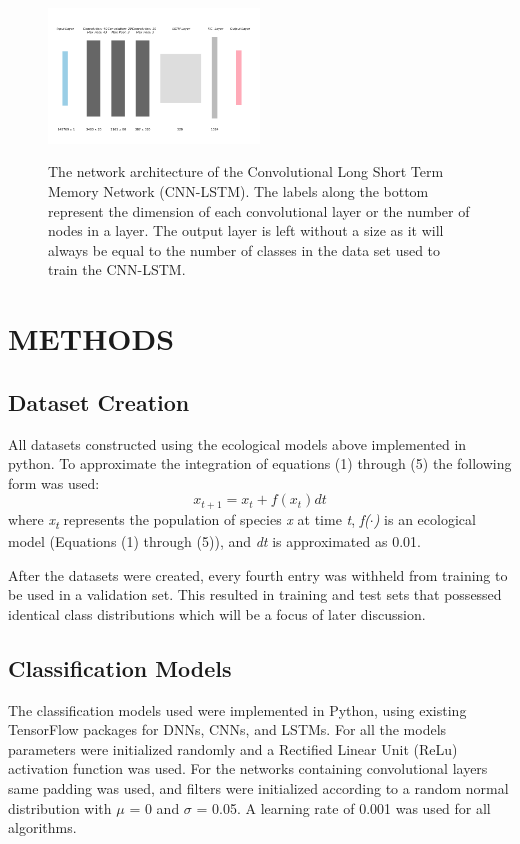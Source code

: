 \documentclass[letterpaper, 10 pt, conference]{ieeeconf}  %
\begin{document}
\begin{figure}
	\centering
    {\label{ref_label2}\includegraphics[width=0.5\textwidth]{cnn_lstm.png}}
    \caption{\label{ref_label_overall}The network architecture of the Convolutional Long Short Term Memory Network (CNN-LSTM). The labels along the bottom represent the dimension of each convolutional layer or the number of nodes in a layer. The output layer is left without a size as it will always be equal to the number of classes in the data set used to train the CNN-LSTM.}
\end{figure} 

\section{METHODS}
\subsection{Dataset Creation}
	All datasets constructed using the ecological models above implemented in python. To approximate the integration of equations (1) through (5) the following form was used:
\begin{equation}x_{t+1} = x_{t} + f(x_{t})dt\end{equation}
where \textit{x\textsubscript{t}} represents the population of species \textit{x} at time \textit{t}, \textit{f($\cdot$)} is an ecological model (Equations (1) through (5)), and \textit{dt} is approximated as 0.01. 
	
    After the datasets were created, every fourth entry was withheld from training to be used in a validation set. This resulted in training and test sets that possessed identical class distributions which will be a focus of later discussion.

\subsection{Classification Models}
	The classification models used were implemented in Python, using existing TensorFlow packages for DNNs, CNNs, and LSTMs. For all the models parameters were initialized randomly and a Rectified Linear Unit (ReLu) activation function was used. For the networks containing convolutional layers same padding was used, and filters were initialized according to a random normal distribution with $\mu$ = 0 and $\sigma$ = 0.05. A learning rate of 0.001 was used for all algorithms. 
    
\end{document}
